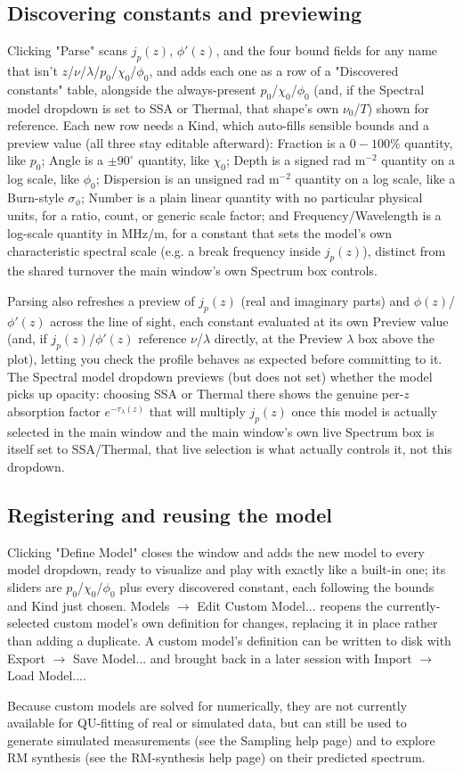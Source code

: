 \subsection{Discovering constants and previewing}
Clicking "Parse" scans $j_p(z)$, $\phi'(z)$, and the four bound fields for any name that isn't $z$/$\nu$/$\lambda$/$p_0$/$\chi_0$/$\phi_0$, and adds each one as a row of a "Discovered constants" table, alongside the always-present $p_0$/$\chi_0$/$\phi_0$ (and, if the Spectral model dropdown is set to SSA or Thermal, that shape's own $\nu_0$/$T$) shown for reference. Each new row needs a Kind, which auto-fills sensible bounds and a preview value (all three stay editable afterward): Fraction is a $0-100\%$ quantity, like $p_0$; Angle is a $\pm90^\circ$ quantity, like $\chi_0$; Depth is a signed rad m$^{-2}$ quantity on a log scale, like $\phi_0$; Dispersion is an unsigned rad m$^{-2}$ quantity on a log scale, like a Burn-style $\sigma_\phi$; Number is a plain linear quantity with no particular physical units, for a ratio, count, or generic scale factor; and Frequency/Wavelength is a log-scale quantity in MHz/m, for a constant that sets the model's own characteristic spectral scale (e.g. a break frequency inside $j_p(z)$), distinct from the shared turnover the main window's own Spectrum box controls.

Parsing also refreshes a preview of $j_p(z)$ (real and imaginary parts) and $\phi(z)$/$\phi'(z)$ across the line of sight, each constant evaluated at its own Preview value (and, if $j_p(z)$/$\phi'(z)$ reference $\nu$/$\lambda$ directly, at the Preview $\lambda$ box above the plot), letting you check the profile behaves as expected before committing to it. The Spectral model dropdown previews (but does not set) whether the model picks up opacity: choosing SSA or Thermal there shows the genuine per-$z$ absorption factor $e^{-\tau_\lambda(z)}$ that will multiply $j_p(z)$ once this model is actually selected in the main window and the main window's own live Spectrum box is itself set to SSA/Thermal, that live selection is what actually controls it, not this dropdown.
\\

\subsection{Registering and reusing the model}
Clicking "Define Model" closes the window and adds the new model to every model dropdown, ready to visualize and play with exactly like a built-in one; its sliders are $p_0$/$\chi_0$/$\phi_0$ plus every discovered constant, each following the bounds and Kind just chosen. Models $\to$ Edit Custom Model... reopens the currently-selected custom model's own definition for changes, replacing it in place rather than adding a duplicate. A custom model's definition can be written to disk with Export $\to$ Save Model... and brought back in a later session with Import $\to$ Load Model....

Because custom models are solved for numerically, they are not currently available for QU-fitting of real or simulated data, but can still be used to generate simulated measurements (see the Sampling help page) and to explore RM synthesis (see the RM-synthesis help page) on their predicted spectrum.
